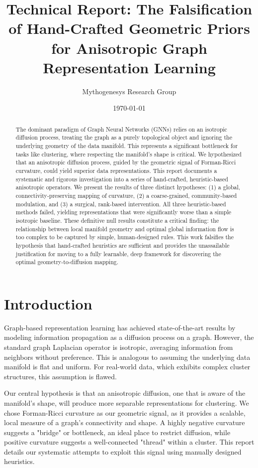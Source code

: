 \documentclass[11pt, a4paper]{article}
\title{\textbf{Technical Report: The Falsification of Hand-Crafted Geometric Priors for Anisotropic Graph Representation Learning}}
\author{Mythogenesys Research Group}
\date{\today}
\begin{document}
\maketitle

\begin{abstract}
\noindent The dominant paradigm of Graph Neural Networks (GNNs) relies on an isotropic diffusion process, treating the graph as a purely topological object and ignoring the underlying geometry of the data manifold. This represents a significant bottleneck for tasks like clustering, where respecting the manifold's shape is critical. We hypothesized that an anisotropic diffusion process, guided by the geometric signal of Forman-Ricci curvature, could yield superior data representations. This report documents a systematic and rigorous investigation into a series of hand-crafted, heuristic-based anisotropic operators. We present the results of three distinct hypotheses: (1) a global, connectivity-preserving mapping of curvature, (2) a coarse-grained, community-based modulation, and (3) a surgical, rank-based intervention. All three heuristic-based methods failed, yielding representations that were significantly worse than a simple isotropic baseline. These definitive null results constitute a critical finding: the relationship between local manifold geometry and optimal global information flow is too complex to be captured by simple, human-designed rules. This work falsifies the hypothesis that hand-crafted heuristics are sufficient and provides the unassailable justification for moving to a fully learnable, deep framework for discovering the optimal geometry-to-diffusion mapping.
\end{abstract}

\section{Introduction}

Graph-based representation learning has achieved state-of-the-art results by modeling information propagation as a diffusion process on a graph. However, the standard graph Laplacian operator is isotropic, averaging information from neighbors without preference. This is analogous to assuming the underlying data manifold is flat and uniform. For real-world data, which exhibits complex cluster structures, this assumption is flawed.

Our central hypothesis is that an anisotropic diffusion, one that is aware of the manifold's shape, will produce more separable representations for clustering. We chose Forman-Ricci curvature as our geometric signal, as it provides a scalable, local measure of a graph's connectivity and shape. A highly negative curvature suggests a "bridge" or bottleneck, an ideal place to restrict diffusion, while positive curvature suggests a well-connected "thread" within a cluster. This report details our systematic attempts to exploit this signal using manually designed heuristics.
\end{document}
